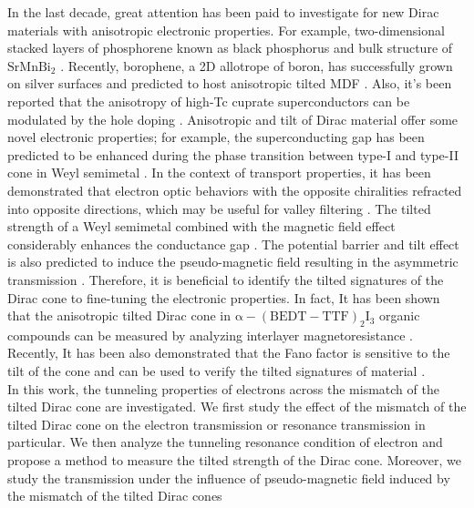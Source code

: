     In the last decade, great attention has been paid to investigate for new Dirac materials with anisotropic electronic properties. 
    For example, two-dimensional stacked layers of phosphorene known as black phosphorus \cite{Xia2014,Kim2015} and bulk structure of $\mathrm{SrMnBi_2}$ \cite{Park2011}. 
    Recently, borophene, a 2D allotrope of boron, has successfully grown on silver surfaces and predicted to host anisotropic tilted MDF \cite{Mannix2015a,Zhou2014}. 
    Also, it’s been reported that the anisotropy of high-Tc cuprate superconductors can be modulated by the hole doping \cite{Marino2019}.
    Anisotropic and tilt of Dirac material offer some novel electronic properties; for example, the superconducting gap has been predicted to be enhanced during the phase transition between type-I and type-II cone in Weyl semimetal \cite{Li2017a}. 
    In the context of transport properties, it has been demonstrated that electron optic behaviors with the opposite chiralities refracted into opposite directions, which may be useful for valley filtering \cite{Nguyen2018a}. 
    The tilted strength of a Weyl semimetal combined with the magnetic field effect considerably enhances the conductance gap \cite{Yesilyurt2017}. 
    The potential barrier and tilt effect is also predicted to induce the pseudo-magnetic field resulting in the asymmetric transmission \cite{Yesilyurt2017a}. 
    Therefore, it is beneficial to identify the tilted signatures of the Dirac cone to fine-tuning the electronic properties. 
    In fact, It has been shown that the anisotropic tilted Dirac cone in $\mathrm{\alpha-(BEDT-TTF)_2I_3}$ organic compounds can be measured by analyzing interlayer magnetoresistance \cite{Morinari2009}. 
    Recently, It has been also demonstrated that the Fano factor is sensitive to the tilt of the cone and can be used to verify the tilted signatures of material \cite{Trescher2015}.\\

    In this work, the tunneling properties of electrons across the mismatch of the tilted Dirac cone are investigated. 
    We first study the effect of the mismatch of the tilted Dirac cone on the electron transmission or resonance transmission in particular. 
    We then analyze the tunneling resonance condition of electron and propose a method to measure the tilted strength of the Dirac cone. 
    Moreover, we study the transmission under the influence of pseudo-magnetic field induced by the mismatch of the tilted Dirac cones

